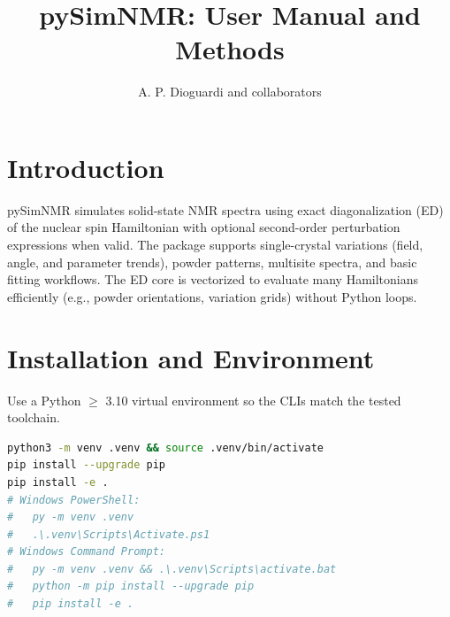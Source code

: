 \documentclass[12pt]{article}
\title{pySimNMR: User Manual and Methods}
\author{A. P. Dioguardi and collaborators}
\begin{document}
\maketitle
\tableofcontents

\section{Introduction}
pySimNMR simulates solid-state NMR spectra using exact diagonalization (ED) of the nuclear spin Hamiltonian with optional second-order perturbation expressions when valid. The package supports single-crystal variations (field, angle, and parameter trends), powder patterns, multisite spectra, and basic fitting workflows. The ED core is vectorized to evaluate many Hamiltonians efficiently (e.g., powder orientations, variation grids) without Python loops.

\section{Installation and Environment}
Use a Python \(\ge\) 3.10 virtual environment so the CLIs match the tested toolchain.
\begin{lstlisting}[language=bash]
python3 -m venv .venv && source .venv/bin/activate
pip install --upgrade pip
pip install -e .
# Windows PowerShell:
#   py -m venv .venv
#   .\.venv\Scripts\Activate.ps1
# Windows Command Prompt:
#   py -m venv .venv && .\.venv\Scripts\activate.bat
#   python -m pip install --upgrade pip
#   pip install -e .
\end{lstlisting}
\end{document}

